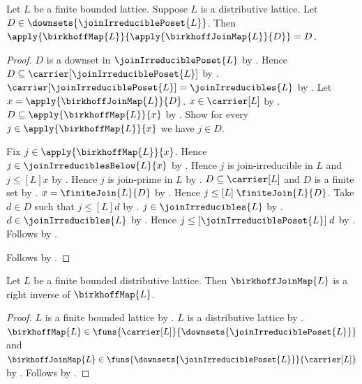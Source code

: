 \begin{theorem}\label{birkhoff_map_after_join}
    Let $L$ be a finite bounded lattice.
    Suppose $L$ is a distributive lattice.
    Let $D\in\downsets{\joinIrreduciblePoset{L}}$.
    Then $\apply{\birkhoffMap{L}}{\apply{\birkhoffJoinMap{L}}{D}}=D$.
\end{theorem}
\begin{proof}
    $D$ is a downset in $\joinIrreduciblePoset{L}$ by
        .
    Hence $D\subseteq\carrier[\joinIrreduciblePoset{L}]$ by
        .
    $\carrier[\joinIrreduciblePoset{L}]=\joinIrreducibles{L}$ by
        .
    Let $x=\apply{\birkhoffJoinMap{L}}{D}$.
    $x\in\carrier[L]$ by
        .
    $D\subseteq\apply{\birkhoffMap{L}}{x}$ by
        .
    Show for every $j\in\apply{\birkhoffMap{L}}{x}$ we have $j\in D$.
    \begin{subproof}
        Fix $j\in\apply{\birkhoffMap{L}}{x}$.
        Hence $j\in\joinIrreduciblesBelow{L}{x}$ by
            .
        Hence $j$ is join-irreducible in $L$ and
            $j\mathrel{\leq[L]}x$ by
            .
        Hence $j$ is join-prime in $L$ by
            .
        $D\subseteq\carrier[L]$ and $D$ is a finite set by
            .
        $x=\finiteJoin{L}{D}$ by .
        Hence $j\mathrel{\leq[L]}\finiteJoin{L}{D}$.
        Take $d\in D$ such that $j\mathrel{\leq[L]}d$ by
            .
        $j\in\joinIrreducibles{L}$ by
            .
        $d\in\joinIrreducibles{L}$ by .
        Hence $j\mathrel{\leq[\joinIrreduciblePoset{L}]}d$ by
            .
        Follows by .
    \end{subproof}
    Follows by .
\end{proof}

\begin{proposition}\label{birkhoff_join_map_is_right_inverse}
    Let $L$ be a finite bounded distributive lattice.
    Then $\birkhoffJoinMap{L}$ is a right inverse of $\birkhoffMap{L}$.
\end{proposition}
\begin{proof}
    $L$ is a finite bounded lattice by .
    $L$ is a distributive lattice by
        .
    $\birkhoffMap{L}\in
        \funs{\carrier[L]}{\downsets{\joinIrreduciblePoset{L}}}$ and
        $\birkhoffJoinMap{L}\in
        \funs{\downsets{\joinIrreduciblePoset{L}}}{\carrier[L]}$ by
        .
    Follows by .
\end{proof}

